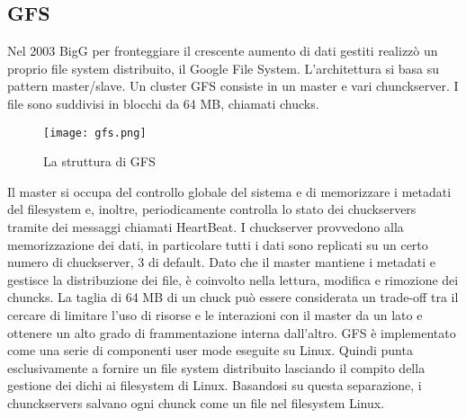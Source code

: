 \subsection{GFS}
Nel 2003 BigG per fronteggiare il crescente aumento di dati gestiti realizzò un proprio file system distribuito, il Google File System. L'architettura si basa su pattern master/slave. Un cluster GFS consiste in un master e vari chunckserver. I file sono suddivisi in blocchi da 64 MB, chiamati chucks. \\
\begin{figure}[ht]
  \begin{center}
    \texttt{[image: gfs.png]}
    \caption{La struttura di GFS}
    \label{hyp}
  \end{center}
\end{figure}
Il master si occupa del controllo globale del sistema e di memorizzare i metadati del filesystem e, inoltre, periodicamente controlla lo stato dei chuckservers tramite dei messaggi chiamati HeartBeat. I chuckserver provvedono alla memorizzazione dei dati, in particolare tutti i dati sono replicati su un certo numero di chuckserver, 3 di default. 
Dato che il master mantiene i metadati e gestisce la distribuzione dei file, è coinvolto nella lettura, modifica e rimozione dei chuncks. La taglia di 64 MB di un chuck può essere considerata un trade-off tra il cercare di limitare l'uso di risorse e le interazioni con il master da un lato e ottenere un alto grado di frammentazione interna dall'altro. GFS è implementato come una serie di componenti user mode eseguite su Linux. Quindi punta esclusivamente a fornire un file system distribuito lasciando il compito della gestione dei dichi ai filesystem di Linux. Basandosi su questa separazione, i chunckservers salvano ogni chunck come un file nel filesystem Linux.
